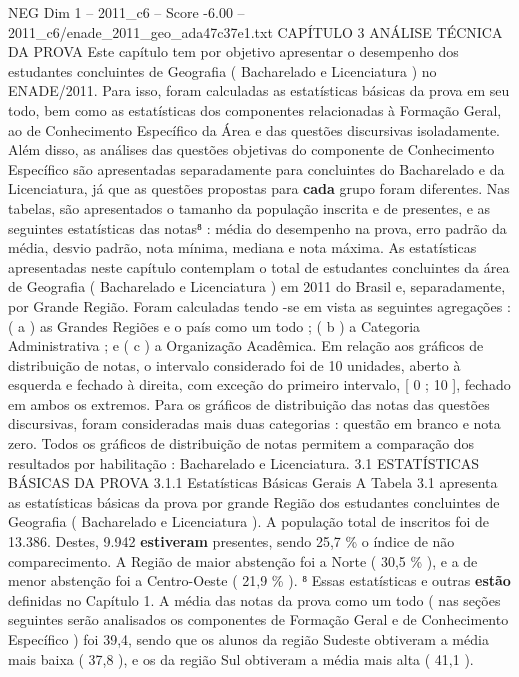 \begin{textsample}{NEG Dim 1 – 2011\_c6 – Score -6.00 – 2011\_c6/enade\_2011\_geo\_ada47c37e1.txt}  \label{ex:f1_neg_221}
CAPÍTULO 3 ANÁLISE TÉCNICA DA PROVA Este capítulo tem por objetivo apresentar o desempenho dos estudantes concluintes de Geografia ( Bacharelado e Licenciatura ) no ENADE/2011.
Para isso, foram calculadas as estatísticas básicas da prova em seu todo, bem como as estatísticas dos componentes relacionadas à Formação Geral, ao de Conhecimento Específico da Área e das questões discursivas isoladamente.
Além disso, as análises das questões objetivas do componente de Conhecimento Específico são apresentadas separadamente para concluintes do Bacharelado e da Licenciatura, já que as questões propostas para \textbf{cada} grupo foram diferentes.
Nas tabelas, são apresentados o tamanho da população inscrita e de presentes, e as seguintes estatísticas das notas⁸ : média do desempenho na prova, erro padrão da média, desvio padrão, nota mínima, mediana e nota máxima.
As estatísticas apresentadas neste capítulo contemplam o total de estudantes concluintes da área de Geografia ( Bacharelado e Licenciatura ) em 2011 do Brasil e, separadamente, por Grande Região.
Foram calculadas tendo -se em vista as seguintes agregações : ( a ) as Grandes Regiões e o país como um todo ; ( b ) a Categoria Administrativa ; e ( c ) a Organização Acadêmica.
Em relação aos gráficos de distribuição de notas, o intervalo considerado foi de 10 unidades, aberto à esquerda e fechado à direita, com exceção do primeiro intervalo, [ 0 ; 10 ], fechado em ambos os extremos.
Para os gráficos de distribuição das notas das questões discursivas, foram consideradas mais duas categorias : questão em branco e nota zero.
Todos os gráficos de distribuição de notas permitem a comparação dos resultados por habilitação : Bacharelado e Licenciatura. 3.1 ESTATÍSTICAS BÁSICAS DA PROVA 3.1.1 Estatísticas Básicas Gerais A Tabela 3.1 apresenta as estatísticas básicas da prova por grande Região dos estudantes concluintes de Geografia ( Bacharelado e Licenciatura ).
A população total de inscritos foi de 13.386.
Destes, 9.942 \textbf{estiveram} presentes, sendo 25,7 \% o índice de não comparecimento.
A Região de maior abstenção foi a Norte ( 30,5 \% ), e a de menor abstenção foi a Centro-Oeste ( 21,9 \% ). ⁸ Essas estatísticas e outras \textbf{estão} definidas no Capítulo 1.
A média das notas da prova como um todo ( nas seções seguintes serão analisados os componentes de Formação Geral e de Conhecimento Específico ) foi 39,4, sendo que os alunos da região Sudeste obtiveram a média mais baixa ( 37,8 ), e os da região Sul obtiveram a média mais alta ( 41,1 ).

\end{textsample}
